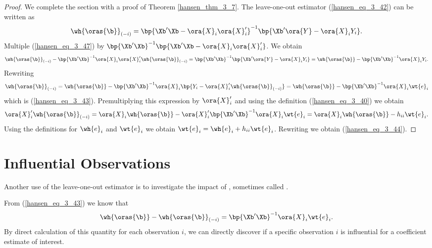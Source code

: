 \begin{proof}
    We complete the section with a proof of Theorem \ref{hansen_thm_3_7}. The leave-one-out estimator (\ref{hansen_eq_3_42}) can be written as 
    \begin{equation}
        \label{hansen_eq_3_47}
        \wh{\oras{\b}}_{(-i)} = \bp{\Xb^\prime \Xb- \ora{X}_i \ora{X}_i^\prime}^{-1} \bp{\Xb^\prime \ora{Y} - \ora{X}_i Y_i}.
    \end{equation}
    Multiple (\ref{hansen_eq_3_47}) by $\bp{\Xb^\prime \Xb}^{-1} \bp{\Xb^\prime \Xb- \ora{X}_i \ora{X}_i^\prime}$. We obtain 
    \begin{equation}
        \notag
        \wh{\oras{\b}}_{(-i)} - \bp{\Xb^\prime \Xb}^{-1}\ora{X}_i \ora{X}_i^\prime\wh{\oras{\b}}_{(-i)} = \bp{\Xb^\prime \Xb}^{-1}\bp{\Xb^\prime \ora{Y} - \ora{X}_i Y_i} = \wh{\oras{\b}} - \bp{\Xb^\prime \Xb}^{-1}\ora{X}_i Y_i.
    \end{equation}
    Rewriting 
    \begin{equation}
        \notag
        \wh{\oras{\b}}_{(-i)} = \wh{\oras{\b}} - \bp{\Xb^\prime \Xb}^{-1} \ora{X}_i \bp{Y_i - \ora{X}_i^\prime\wh{\oras{\b}}_{(-i)}} = \wh{\oras{\b}} - \bp{\Xb^\prime \Xb}^{-1}\ora{X}_i \wt{e}_i
    \end{equation}
    which is (\ref{hansen_eq_3_43}). Premultiplying this expression by $\ora{X}_i^\prime$ and using the definition (\ref{hansen_eq_3_40}) we obtain 
    \begin{equation}
        \ora{X}_i^\prime\wh{\oras{\b}}_{(-i)} = \ora{X}_i \wh{\oras{\b}} - \ora{X}_i^\prime \bp{\Xb^\prime \Xb}^{-1}\ora{X}_i \wt{e}_i = \ora{X}_i \wh{\oras{\b}} - h_{ii} \wt{e}_i.
    \end{equation}
    Using the definitions for $\wh{e}_i$ and $\wt{e}_i$ we obtain $\wt{e}_i = \wh{e}_i + h_{ii} \wt{e}_i$. Rewriting we obtain (\ref{hansen_eq_3_44}).
\end{proof}

\section{Influential Observations}

Another use of the leave-one-out estimator is to investigate the impact of , sometimes called . 

From (\ref{hansen_eq_3_43}) we know that 
\begin{equation}
    \label{hansen_eq_3_48}
    \wh{\oras{\b}} - \wh{\oras{\b}}_{(-i)} = \bp{\Xb^\prime \Xb}^{-1} \ora{X}_i \wt{e}_i.
\end{equation}
By direct calculation of this quantity for each observation $i$, we can directly discover if a specific observation $i$ is influential for a coefficient estimate of interest.

